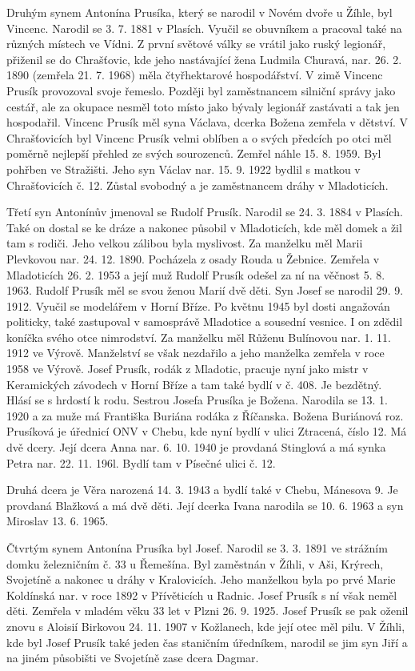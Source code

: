 \documentclass[../dejiny-rodu-prusiku.tex]{subfiles}
\begin{document}
Druhým synem Antonína Prusíka, který se narodil v No­vém dvoře u Žíhle, byl Vincenc. Narodil se 3. 7. 1881 v Plasích. Vyučil se obuvníkem a pracoval také na různých místech ve Vídni. Z první světové války se vrá­til jako ruský legionář, přiženil se do Chrašťovic, kde jeho nastávající žena Ludmila Churavá, nar. 26. 2. 1890 (zemřela 21. 7. 1968) měla čtyřhektarové hospodářství. V zimě Vincenc Prusík provozoval svoje řemeslo. Později byl zaměstnancem silniční správy jako cestář, ale za okupace nesměl toto místo jako bývaly legionář zastávati a tak jen hospodařil. Vincenc Prusík měl syna Václava, dcerka Božena zemřela v dětství. V Chrašťovicích byl Vincenc Prusík velmi oblíben a o svých předcích po otci měl poměrně nejlepší přehled ze svých sourozenců. Zemřel náhle 15. 8. 1959. Byl pohřben ve Stražišti. Jeho syn Václav nar. 15. 9. 1922 bydlil s matkou v Chrašťovicích č. 12. Zůstal svobodný a je zaměstnancem dráhy v Mladoticích.

Třetí syn Antonínův jmenoval se Rudolf Prusík. Narodil se 24. 3. 1884 v Plasích. Také on dostal se ke dráze a nakonec působil v Mladoticích, kde měl domek a žil tam s rodiči. Jeho velkou zálibou byla myslivost. Za manžel­ku měl Marii Plevkovou nar. 24. 12. 1890. Pocházela z osa­dy Rouda u Žebnice. Zemřela v Mladoticích 26. 2. 1953 a její muž Rudolf Prusík odešel za ní na věčnost 5. 8. 1963. Rudolf Prusík měl se svou ženou Marií dvě děti. Syn Josef se narodil 29. 9. 1912. Vyučil se modelářem v Horní Bříze. Po květnu 1945 byl dosti angažován politicky, také zastupoval v samosprávě Mladotice a sousední vesnice. I on zdědil koníčka svého otce nimrodství. Za manželku měl Růženu Bulínovou nar. 1. 11. 1912 ve Výrově. Manželství se však nezdařilo a jeho manželka zemřela v roce 1958 ve Výrově. Josef Prusík, rodák z Mladotic, pracuje nyní ja­ko mistr v Keramických závodech v Horní Bříze a tam také bydlí v č. 408. Je bezdětný. Hlásí se s hrdostí k rodu. Sestrou Josefa Prusíka je Božena. Narodila se 13. 1. 1920 a za muže má Františka Buriána rodáka z Říčanska. Božena Buriánová roz. Prusíková je úřednicí ONV v Chebu, kde nyní bydlí v ulici Ztracená, číslo 12. Má dvě dce­ry. Její dcera Anna nar. 6. 10. 1940 je provdaná Stinglová a má synka Petra nar. 22. 11. 196l. Bydlí tam v Písečné ulici č. 12.

Druhá dcera je Věra narozená 14. 3. 1943 a bydlí také v Chebu, Mánesova 9. Je provdaná Blažková  a má dvě dě­ti. Její dcerka Ivana narodila se 10. 6. 1963 a syn Miroslav 13. 6. 1965.

Čtvrtým synem Antonína Prusíka byl Josef. Narodil se 3. 3. 1891 ve strážním domku železničním č. 33 u Řemešína. Byl zaměstnán v Žíhli, v Aši, Krýrech, Svojetíně a nakonec u dráhy v Kralovicích. Jeho man­želkou byla po prvé Marie Koldínská nar. v roce 1892 v Přívěticích u Radnic. Josef Prusík s ní však neměl děti. Zemřela v mladém věku 33 let v Plzni 26. 9. 1925. Josef Prusík se pak oženil znovu s Aloisií Birkovou 24. 11. 1907 v Kožlanech, kde její otec měl pilu. V Žíhli, kde byl Josef  Prusík také jeden čas staničním úředníkem, narodil se jim syn Jiří a na jiném působišti ve Svojetíně zase dcera Dagmar.
\end{document}
